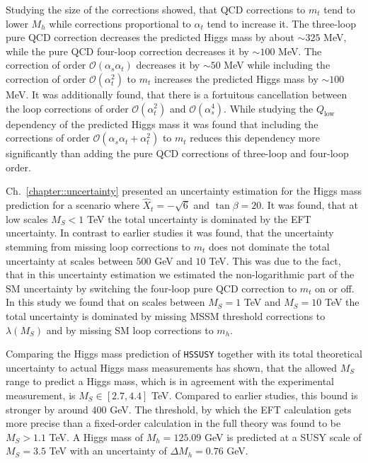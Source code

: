 \documentclass[a4paper,12pt]{book}
\begin{document}
Studying the size of the corrections showed, that QCD corrections to $m_t$ tend to lower $M_h$ while corrections proportional to $\alpha_t$ tend to increase it. The three-loop pure QCD correction decreases the predicted Higgs mass by about $\sim 325$ MeV, while the pure QCD four-loop correction decreases it by $\sim 100$ MeV. The correction of order $\mathcal{O}(\alpha_s\alpha_t)$ decreases it by $\sim 50$ MeV while including the correction of order $\mathcal{O}(\alpha_t^2)$ to $m_t$ increases the predicted Higgs mass by $\sim 100$ MeV. It was additionally found, that there is a fortuitous cancellation between the loop corrections of order $\mathcal{O}(\alpha_t^2)$ and $\mathcal{O}(\alpha_s^4)$. While studying the $Q_\text{low}$ dependency of the predicted Higgs mass it was found that including the corrections of order $\mathcal{O}(\alpha_s\alpha_t+\alpha_t^2)$ to $m_t$ reduces this dependency more significantly than adding the pure QCD corrections of three-loop and four-loop order.\par 
Ch.\ \ref{chapter::uncertainty} presented an uncertainty estimation for the Higgs mass prediction for a scenario where $\hat{X}_t = -\sqrt{6}$ and $\tan\beta = 20$. It was found, that at low scales $M_S < 1$ TeV the total uncertainty is dominated by the EFT uncertainty. In contrast to earlier studies it was found, that the uncertainty stemming from missing loop corrections to $m_t$ does not dominate the total uncertainty at scales between $500$ GeV and $10$ TeV. This was due to the fact, that in this uncertainty estimation we estimated the non-logarithmic part of the SM uncertainty by switching the four-loop pure QCD correction to $m_t$ on or off. In this study we found that on scales between $M_S=1$ TeV and $M_S=10$ TeV the total uncertainty is dominated by missing MSSM threshold corrections to $\lambda(M_S)$ and by missing SM loop corrections to $m_h$.\par 
Comparing the Higgs mass prediction of \texttt{HSSUSY} together with its total theoretical uncertainty to actual Higgs mass measurements has shown, that the allowed $M_S$ range to predict a Higgs mass, which is in agreement with the experimental measurement, is $M_S \in [2.7,4.4]$ TeV. Compared to earlier studies, this bound is stronger by around $400$ GeV. The threshold, by which the EFT calculation gets more precise than a fixed-order calculation in the full theory was found to be $M_S>1.1$ TeV. A Higgs mass of $M_h=125.09$ GeV is predicted at a SUSY scale of $M_S = 3.5$ TeV with an uncertainty of $\Delta M_h = 0.76$ GeV.\par 
\end{document}
